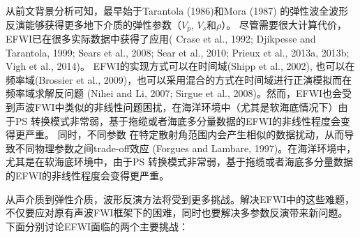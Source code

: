 从前文背景分析可知，最早始于Tarantola (1986)\cite{tarantola:1986}和Mora (1987)\cite{mora:1987}
的弹性波全波形反演能够获得更多地下介质的弹性参数（$V_p$, $V_s$和$\rho$）。
尽管需要很大计算代价，EFWI已在很多实际数据中获得了应用(
Crase et al., 1992\cite{crase1992nonlinear}; Djikpesse and Tarantola,
1999\cite{djikpesse.tarantola:1999}; Sears et al., 2008\cite{sears2008}; Sear et al.,
2010\cite{sears:2010}; Prieux et al., 2013a\cite{prieux:2013a}, 2013b\cite{prieux:2013b}; Vigh et al.,
2014\cite{vigh:2014})。
EFWI的实现方式可以在时间域(Shipp et al., 2002\cite{shipp:2002}),
也可以在频率域(Brossier et al.,
2009\cite{brossier2009})，也可以采用混合的方式在时间域进行正演模拟而在频率域求解反问题
(Nihei and Li, 2007\cite{nihei.li:2007}; Sirgue et al.,
2008\cite{sirgue:2008})。然而，EFWI也会受到声波FWI中类似的非线性问题困扰，在海洋环境中（尤其是软海底情况下）由于PS
转换模式非常弱，基于拖缆或者海底多分量数据的EFWI的非线性程度会变得更严重\cite{sears2008}。
同时，不同参数
在特定散射角范围内会产生相似的数据扰动，从而导致不同物理参数之间trade-off效应
(Forgues and Lambare, 1997\cite{forgues.lambare:1997})。在海洋环境中，尤其是在软海底环境中，由于PS
转换模式非常弱，基于拖缆或者海底多分量数据的EFWI的非线性程度会变得更严重\cite{sears2008}。

从声介质到弹性介质，波形反演方法将受到更多挑战。解决EFWI中的这些难题，
不仅要应对原有声波FWI框架下的困难，同时也要解决多参数反演带来新问题。下面分别讨论EFWI面临的两个主要挑战：

